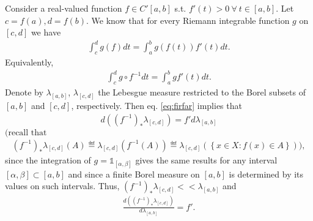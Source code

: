 \begin{example}
    Consider a real-valued function \(f\in C'[a,b]\) s.t. \(f'(t)>0 \ \forall \ t\in[a,b]\). Let \(c=f(a), d=f(b)\). We know that for every
    Riemann integrable function \(g\) on \([c,d]\) we have
    \begin{align*}
        \int_{c}^{d}g(f)dt = \int_{a}^{b}g(f(t))f'(t)dt.
    \end{align*}
    Equivalently, 
    \begin{align}  \label{eq:firfar}
        \int_{c}^{d} g\circ f^{-1}dt = \int_{a}^{b}gf'(t)dt.
    \end{align}
    Denote by \(\lambda_{[a,b]}\), \(\lambda_{[c,d]}\) the Lebesgue measure restricted to the Borel subsets of \([a,b]\) and 
    \([c,d]\), respectively. Then eq. \ref{eq:firfar} implies that 
    \begin{align*}
        d\left((f^{-1})_{*}\lambda_{[c,d]}\right) = f'd\lambda_{[a,b]}
    \end{align*}
    \(\Biggl(\text{recall that}\)
    \begin{align*}
        (f^{-1})_{*}\lambda_{[c,d]} (A) \eqdef \lambda_{[c,d]}(f^{-1}(A))\eqdef \lambda_{[c,d]}\left(\left\{ x\in X : f(x) \in A\right\}\right) \Biggr),
    \end{align*}
    since the integration of \(g=\mathds{1}_{[\alpha,\beta]}\) gives the same results for any interval \([\alpha,\beta]\subset[a,b]\)
    and since a finite Borel measure on \([a,b]\) is determined by its values on such intervals. Thus, 
    \((f^{-1})_{*}\lambda_{[c,d]}<<\lambda_{[a,b]}\) and
    \begin{align*}
        \frac{d\left((f^{-1})_{*}\lambda_{[c,d]}\right)}{d\lambda_{[a,b]}} = f'.
    \end{align*}
\end{example}